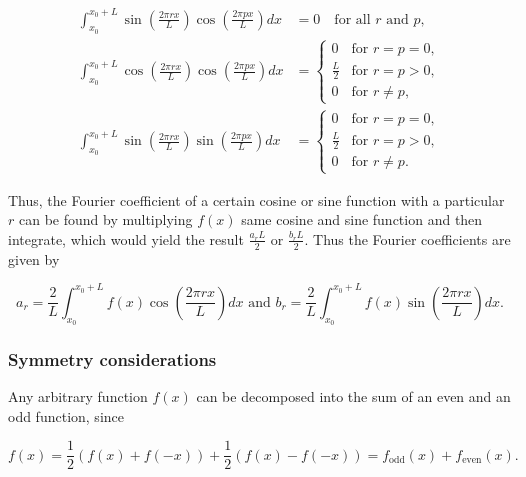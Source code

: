 \documentclass[english,a4paper,12pt]{report}
\begin{document}
\begin{equation}
    \begin{aligned}
        \int_{x_0}^{x_0+L} \sin\left(\frac{2\pi r x}{L}\right) \cos\left(\frac{2\pi p x}{L}\right) dx &= 0 \quad \text{for all } r \text{ and } p, \\
        \int_{x_0}^{x_0+L} \cos\left(\frac{2\pi r x}{L}\right) \cos\left(\frac{2\pi p x}{L}\right) dx &=
\begin{cases} 
    0 & \text{for } r = p = 0, \\
    \frac{L}{2} & \text{for } r = p > 0, \\
    0 & \text{for } r \neq p,
\end{cases} \\
\int_{x_0}^{x_0+L} \sin\left(\frac{2\pi r x}{L}\right) \sin\left(\frac{2\pi p x}{L}\right) dx &=
\begin{cases} 
    0 & \text{for } r = p = 0, \\
    \frac{L}{2} & \text{for } r = p > 0, \\
    0 & \text{for } r \neq p.
\end{cases}
    \end{aligned}
\end{equation}

Thus, the Fourier coefficient of a certain cosine or sine function with a particular \(r\) can be found by multiplying \(f(x)\) same cosine and sine function and then integrate, which would yield the result \(\frac{a_{r} L}{2} \text { or } \frac{b_{r}L }{2} \). Thus the Fourier coefficients are given by 

\begin{equation}
    a_{r} = \frac{2}{L} \int_{x_0}^{x_0 + L} f(x) \cos \left( \frac{2\pi rx}{L}  \right) dx \text { and } b_{r} = \frac{2}{L} \int_{x_0 }^{x_0 + L} f(x) \sin \left( \frac{2\pi rx}{L}  \right) dx.   
\end{equation}

\subsubsection{Symmetry considerations}

Any arbitrary function \(f(x)\) can be decomposed into the sum of an even and an odd function, since

\begin{equation}
    f(x) = \frac{1}{2}(f(x) + f(-x)) + \frac{1}{2} (f(x) - f(-x)) = f_{\text{odd} }(x) + f_{\text{even} }(x).
\end{equation}
\end{document}
